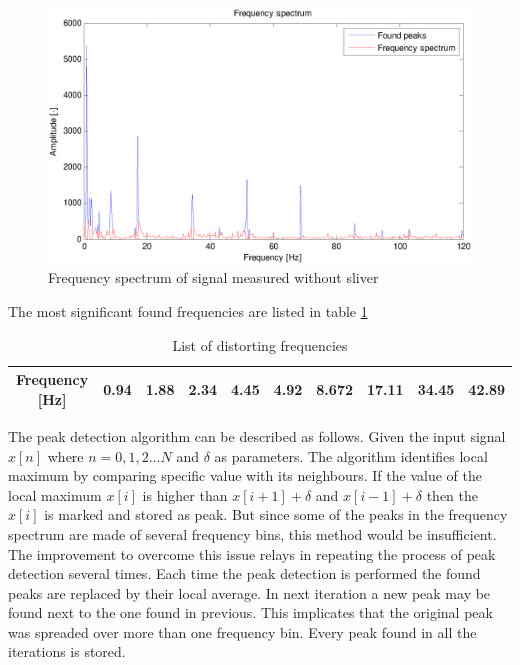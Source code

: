 \documentclass[twoside]{ctuthesis}
\theoremstyle{plain}
\theoremstyle{definition}
\theoremstyle{note}
\begin{document}
\begin{figure}[h]
	\centering
	\includegraphics[width=1.0\textwidth]{withoutMat_foundPeaks_half.eps}
	\caption{Frequency spectrum of signal measured without sliver}
	\label{fig:withoutMat_foundPeaks}
\end{figure}

The most significant found frequencies are listed in table 	\ref{tab:DistortinFreq}%
\begin{table}[htbp]
	\centering
	\caption{List of distorting frequencies}
	\begin{tabular}{crrrrrrrrr}
		\midrule
		Frequency [Hz]  & 0.94  & 1.88   & 2.34 & 4.45   & 4.92  & 8.672  & 17.11   & 34.45 & 42.89 \\
				
		\bottomrule
	\end{tabular}%
	\label{tab:DistortinFreq}%
\end{table}%

The peak detection algorithm can be described as follows. Given the input signal $x[n]$ where $n=0,1,2\ldots N$ and $\delta$ as parameters. The algorithm identifies local maximum by comparing specific value with its neighbours. If the value of the local maximum $x[i]$ is higher than $x[i+1] + \delta $ and $x[i-1] + \delta$ then the $x[i]$ is marked and stored as peak.
But since some of the peaks in the frequency spectrum are made of several frequency bins, this method would be insufficient. The improvement to overcome this issue relays in repeating the process of peak detection several times. Each time the peak detection is performed the found peaks are replaced by their local average. In next iteration a new peak may be found next to the one found in previous. This implicates that the original peak was spreaded over more than one frequency bin. Every peak found in all the iterations is stored.
\end{document}

